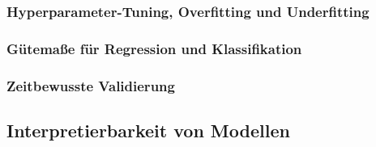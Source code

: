 \documentclass[12pt,a4paper]{article}
\begin{document}
\subsubsection{Hyperparameter-Tuning, Overfitting und Underfitting}



\subsubsection{Gütemaße für Regression und Klassifikation}

\subsubsection{Zeitbewusste Validierung}



\subsection{Interpretierbarkeit von Modellen}

\end{document}
